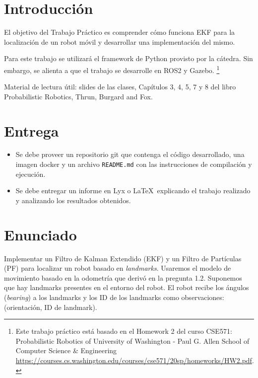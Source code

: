 \documentclass[tp]{lcc}
\begin{document}
	\maketitle
	
	
	\section{Introducción}
	
	El objetivo del Trabajo Práctico es comprender cómo funciona EKF para la localización de un robot móvil y desarrollar una implementación del mismo.
	
	Para este trabajo se utilizará el framework de Python provisto por la cátedra. Sin embargo, se alienta a que el trabajo se desarrolle en ROS2 y Gazebo. \footnote{Este trabajo práctico está basado en el Homework 2 del curso CSE571: Probabilistic Robotics of University of Washington - Paul G. Allen School of Computer Science \& Engineering \url{https://courses.cs.washington.edu/courses/cse571/20sp/homeworks/HW2.pdf}.}
	
	Material de lectura útil: slides de las clases, Capítulos 3, 4, 5, 7 y 8 del libro Probabilistic Robotics, Thrun, Burgard and Fox.
	
	
	\section{Entrega}
	\begin{itemize}
		\item Se debe proveer un repositorio git que contenga el código desarrollado, una imagen docker y un archivo \lstinline{README.md} con las instrucciones de compilación y ejecución.
		
		\item Se debe entregar un informe en Lyx o \LaTeX\  explicando el trabajo realizado y analizando los resultados obtenidos.
	\end{itemize}

	
	\section{Enunciado}
		
	Implementar un Filtro de Kalman Extendido (EKF) y un Filtro de Partículas (PF) para localizar un robot basado en \emph{landmarks}. Usaremos el modelo de movimiento basado en la odometría que derivó en la pregunta 1.2. Suponemos que hay landmarks presentes en el entorno del robot. El robot recibe los ángulos (\emph{bearing}) a los landmarks y los ID de los landmarks como observaciones: (orientación, ID de landmark).
	
\end{document}
